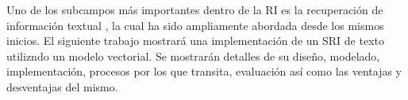 Uno de los subcampos más importantes dentro de la RI es la recuperación de
información textual \cite{boyce, blair}, la cual ha sido ampliamente abordada
desde los mismos inicios. El siguiente trabajo mostrará una implementación de un SRI
de texto utilizndo un modelo vectorial. Se mostrarán detalles de su diseño,
modelado, implementación, procesos por los que transita, evaluación así como
las ventajas y desventajas del mismo.
